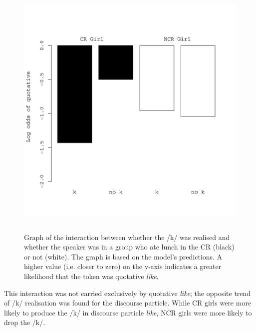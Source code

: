 \begin{figure}
	\centering
		\includegraphics[height=5in]{images/kCR.jpg}
	\caption{Graph of the interaction between whether the /k/ was realised and whether the speaker was in a group who ate lunch in the CR (black) or not (white).  The graph is based on the model's predictions.  A higher value (i.e. closer to zero) on the y-axis indicates a greater likelihood that the token was quotative \textit{like}.}
	\label{fig:kCR-qdp}
\end{figure}





This interaction was not carried exclusively by quotative \textit{like}; the opposite trend of /k/ realisation was found for the discourse particle.  While CR girls were more likely to produce the /k/ in discourse particle \textit{like}, NCR girls were more likely to drop the /k/.

